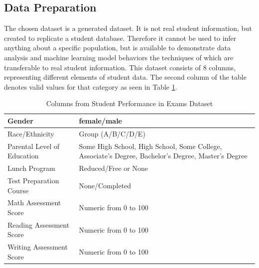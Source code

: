 \documentclass[doc]{apa6} %
\begin{document}
\subsection{Data Preparation}
The chosen dataset \cite{dataset} is a generated dataset. It is not real student information, but created to replicate a student database. Therefore it cannot be used to infer anything about a specific population, but is available to demonstrate data analysis and machine learning model behaviors the techniques of which are transferable to real student information. This dataset consists of 8 columns, representing different elements of student data.  The second column of the table denotes valid values for that category as seen in Table \ref{tab:datasetCol}.
\begin{table}[H]
    \centering
    \begin{tabular}{|l|p{8cm}|}
    \hline
        Gender & female/male\\
        \hline
        Race/Ethnicity & Group (A/B/C/D/E)\\
        \hline
        Parental Level of Education & Some High School, High School, Some College, Associate's Degree, Bachelor's Degree, Master's Degree\\
        \hline
        Lunch Program & Reduced/Free or None\\
        \hline
        Test Preparation Course & None/Completed\\
        \hline
        Math Assessment Score & Numeric from 0 to 100\\
        \hline
        Reading Assessment Score & Numeric from 0 to 100\\
        \hline
        Writing Assessment Score & Numeric from 0 to 100\\
        \hline
    \end{tabular}
    \caption{Columns from Student Performance in Exams Dataset}
    \label{tab:datasetCol}
\end{table}
\end{document}
